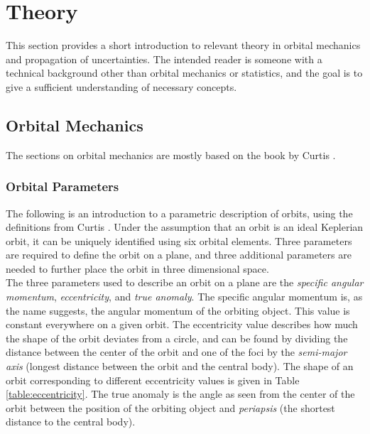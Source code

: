 
\section{Theory}

This section provides a short introduction to relevant theory in orbital mechanics and propagation of uncertainties. The intended reader is someone with a technical background other than orbital mechanics or statistics, and the goal is to give a sufficient understanding of necessary concepts. 


\subsection{Orbital Mechanics}

The sections on orbital mechanics are mostly based on the book by Curtis \cite{Curtis2009}.



\subsubsection{Orbital Parameters}

The following is an introduction to a parametric description of orbits, using the definitions from Curtis \cite{Curtis2009}. Under the assumption that an orbit is an ideal Keplerian orbit, it can be uniquely identified using six orbital elements. Three parameters are required to define the orbit on a plane, and three additional parameters are needed to further place the orbit in three dimensional space. \\

The three parameters used to describe an orbit on a plane are the \textit{specific angular momentum}, \textit{eccentricity}, and \textit{true anomaly}. The specific angular momentum is, as the name suggests, the angular momentum of the orbiting object. This value is constant everywhere on a given orbit. The eccentricity value describes how much the shape of the orbit deviates from a circle, and can be found by dividing the distance between the center of the orbit and one of the foci by the \textit{semi-major axis} (longest distance between the orbit and the central body). The shape of an orbit corresponding to different eccentricity values is given in Table \ref{table:eccentricity}. The true anomaly is the angle as seen from the center of the orbit between the position of the orbiting object and \textit{periapsis} (the shortest distance to the central body). \\

